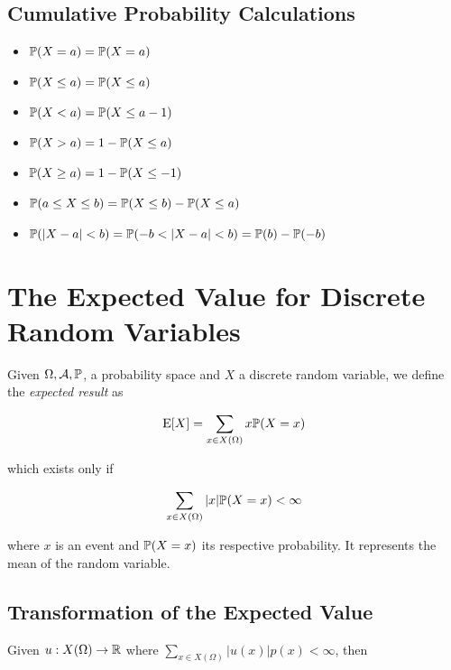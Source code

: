 \subsection{Cumulative Probability Calculations}

\begin{itemize}

    \item \(\mathbb{P}(X = a) = \mathbb{P}(X = a)\)

    \item \(\mathbb{P}(X \le a) = \mathbb{P}(X \le a)\)

    \item \(\mathbb{P}(X < a) = \mathbb{P}(X \le a - 1)\)

    \item \(\mathbb{P}(X > a) = 1 - \mathbb{P}(X \le a)\)

    \item \(\mathbb{P}(X \ge a) = 1 - \mathbb{P}(X \le - 1)\)

    \item \(\mathbb{P}(a \le X \le b) = \mathbb{P}(X \le b) - \mathbb{P}(X \le a)\)

    \item \(\mathbb{P}(|X - a| < b) = \mathbb{P}(-b < |X - a| < b) = \mathbb{P}(b) - \mathbb{P}(-b) \)

\end{itemize}

\section{The Expected Value for Discrete Random Variables}

Given \(\Omega, \mathcal{A}, \mathbb{P}\), a probability space and \(X\) a discrete random variable, we 
define the \emph{expected result} as 

\[
    \mathrm{E}[X] = \sum_{x \in X(\Omega)} x \mathbb{P}(X = x)
\]

which exists only if 

\[
    \sum_{x \in X(\Omega)} |x| \mathbb{P}(X = x) < \infty
\]

where \(x\) is an event and \(\mathbb{P}(X = x)\) its respective probability. It represents the mean of the random variable.

\subsection{Transformation of the  Expected Value}

Given \(u: X(\Omega) \to \mathbb{R}\) where \(\sum_{x \in X(\Omega)} |u(x)|p(x) < \infty\), then 

